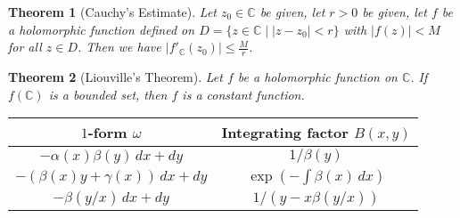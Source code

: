\documentclass[9pt]{article}
\theoremstyle{break}
\theoremstyle{break}
\newtheorem{thm}{Theorem}[section]
\newcommand{\Complex}{\mathbb{C}}
\begin{document}
\begin{thm}[Cauchy's Estimate]
Let $z_0 \in \Complex$ be given, let $r>0$ be given, let $f$ be a holomorphic function defined on $D = \{ z \in \Complex \mid |z-z_0| < r\}$ with $|f(z)|<M$ for all $z \in D$. Then we have $|f'_{\Complex}(z_0)| \leq \frac{M}{r}$. 
\end{thm}


\begin{thm}[Liouville's Theorem]
Let $f$ be a holomorphic function on $\Complex$. If $f(\Complex)$ is a bounded set, then $f$ is a constant function.
\end{thm}

\hfill\break
\begin{center}
\begin{tabular}{|c|c|}
\hline
\cellcolor{orange!29} $1$-form $\omega$ & \cellcolor{blue!29} Integrating factor $B(x,y)$\\
\hline
$-\alpha(x)\beta(y)\, dx + dy$ & $1/\beta(y)$ \\
\hline
$-(\beta(x)y+\gamma(x))\, dx + dy$ & $\exp(-\int \beta(x)\, dx)$\\
\hline
$-\beta(y/x)\, dx + dy$ & $1/(y-x\beta(y/x))$\\
\hline
\end{tabular}
\end{center}
\end{document}
